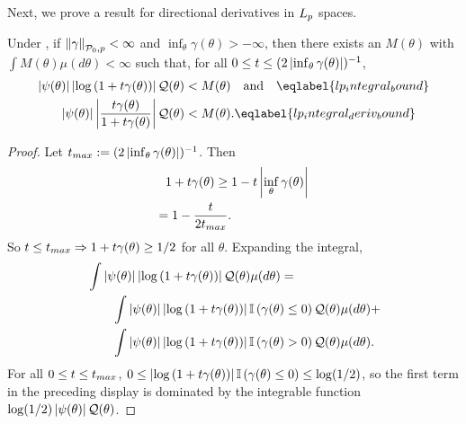 Next, we prove a result for directional derivatives in ${L_{p}}$ spaces.


\begin{lem}
%
Under , if $\left\Vert\gamma\right\Vert_{\mathcal{P}_{0}, p} < \infty$
and $\inf_\theta \gamma(\theta) > -\infty$, then there
exists an $M(\theta)$ with $\int M(\theta) \mu(d\theta) < \infty$
such that, for all $0 \le t \le (2 \left|\inf_\theta \gamma(\theta)\right|)^{-1}$,
%
\begin{align}
%
\abs{\psi(\theta)}\abs{\log\left(1 + \t \gamma(\theta)\right)}\q(\theta)
    <{}& M(\theta) \mathand \eqlabel{lp_integral_bound}\\
%
\abs{\psi(\theta)}\abs{\frac{\t \gamma(\theta)}{1 + \t \gamma(\theta)}}\q(\theta)
    <{}& M(\theta). \eqlabel{lp_integral_deriv_bound}
%
\end{align}
%
\begin{proof}

Let $t_{max} := (2 \left|\inf_\theta \gamma(\theta)\right|)^{-1}$.  Then
%
\begin{align*}
%
1 + \t \gamma(\theta) \ge{}& 1 - \t \abs{\inf_\theta \gamma(\theta)}
\\={}
    1 - \frac{\t}{2 \t_{max}}.
%
\end{align*}
%
So $t \le t_{max} \Rightarrow 1 + t \gamma(\theta) \ge 1/2$ for all $\theta$.
Expanding the integral,
%
\begin{align*}
%
\MoveEqLeft
\int \abs{\psi(\theta)}
    \abs{\log\left(1 + \t \gamma(\theta)\right)}\q(\theta)
    \mu(d\theta) ={}
\\&
\int \abs{\psi(\theta)}
    \abs{\log\left(1 + \t \gamma(\theta)\right)}
    \ind{\gamma(\theta) \le 0}
    \q(\theta)\mu(d\theta)  +
\\&
\int \abs{\psi(\theta)}
    \abs{\log\left(1 + \t \gamma(\theta)\right)}
    \ind{\gamma(\theta) > 0}
    \q(\theta)\mu(d\theta).
%
\end{align*}
%
For all $0 \le t \le t_{max}$, $0 \le \left|\log\left(1 + t
\gamma(\theta)\right)\right| \mathbb{I}\left(\gamma(\theta) \le 0\right) \le \log(1/2)$,
so the first term in the preceding display is dominated by the integrable
function $\log(1/2) \left|\psi(\theta)\right|\mathcal{Q}(\theta)$.


\end{proof}
\end{lem}
